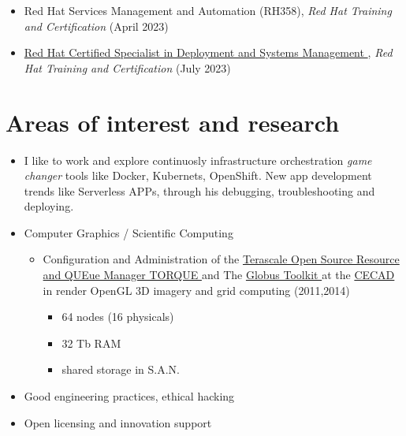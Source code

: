 \documentclass[overlapped,line,final]{../../templates/MichaelDeCorteCV/lib/res}
\begin{document}
\begin{resume}
\begin{itemize}
	\item Red Hat Services Management and Automation (RH358), \textit{Red Hat Training and Certification} (April 2023) \href{https://raw.githubusercontent.com/dtorot/NemqCV/profile-engineer/latex/docs/Certificate of Attendance (RH358).pdf}{}
	\item \href{https://raw.githubusercontent.com/dtorot/NemqCV/profile-engineer/latex/docs/Red_Hat_Certified_Specialist_in_Deployment_and_Systems_Management.pdf}{Red Hat Certified Specialist in Deployment and Systems Management }, \textit{Red Hat Training and Certification} (July 2023) 
\end{itemize} 

\section{\sc Areas of interest and research}
\vspace{0.5cm}
\begin{itemize}
	\item I like to work and explore continuosly infrastructure orchestration \textit{game changer} tools like Docker, Kubernets, OpenShift. New app development trends like Serverless APPs, through his debugging, troubleshooting and deploying.
    \item Computer Graphics / Scientific Computing
	    \begin{itemize}
		\item Configuration and Administration of the \href {https://github.com/adaptivecomputing/torque#torque-resource-manager}{Terascale Open Source Resource and QUEue Manager TORQUE } and The \href{https://toolkit.globus.org/}{Globus Toolkit } at the \href{https://cecad.udistrital.edu.co/}{CECAD } in render OpenGL 3D imagery and grid computing (2011,2014)
	 \begin{itemize}
	  \item 64 nodes (16 physicals)
	  \item 32 Tb RAM
	  \item shared storage in S.A.N.
	 \end{itemize}
	\end{itemize}
    	\item Good engineering practices, ethical hacking
	\item Open licensing and innovation support

\end{itemize}
\end{resume}
\end{document}
